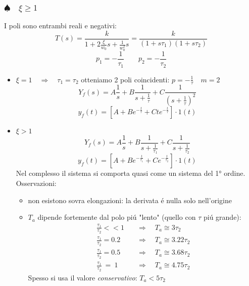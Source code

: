 \documentclass[../main.tex]{subfiles}
\begin{document}
	\subsubsection{$ \spadesuit \quad \xi \geq 1 $}
	I poli sono entrambi reali e negativi:
	\[ T(s) = \frac{k}{1+2\frac{\xi}{w_0}s+\frac{1}{w_0^2}s} = \frac{k}{(1+s\tau_1)(1+s\tau_2)} \]
	\[ p_1 = -\frac{1}{\tau_1} \qquad p_2 = -\frac{1}{\tau_2} \]
	\begin{itemize}
		\item $ \xi = 1 \quad \Rightarrow \quad \tau_1 = \tau_2 $
		otteniamo 2 poli coincidenti: $ p = -\frac{1}{\tau} \quad m = 2 $
		\[ Y_f(s) = A\frac{1}{s} + B\frac{1}{s+\frac{1}{\tau}} + C\frac{1}{(s+\frac{1}{\tau})^2} \]
		\[ y_f(t) = \left[ A + Be^{-\frac{t}{\tau}} + C t e^{-\frac{t}{\tau}} \right] \cdot 1(t) \]
		\item $ \xi > 1 $
		\[ Y_f(s) = A\frac{1}{s} + B\frac{1}{s+\frac{1}{\tau_1}} + C\frac{1}{s+\frac{1}{\tau_2}} \]
		\[ y_f(t) = \left[ A + Be^{-\frac{t}{\tau_1}} + Ce^{-\frac{t}{\tau_2}} \right] \cdot 1(t) \]
		Nel complesso il sistema si comporta quasi come un sistema del 1° ordine.\\
		Osservazioni:
		\begin{itemize}
			\item non esistono sovra elongazioni: la derivata \'e nulla solo nell'origine
			\item $ T_a $ dipende fortemente dal polo pi\'u "lento" (quello con $ \tau $ pi\'u grande):
			\begin{align*}
				\frac{\tau_1}{\tau_2} << 1 \quad &\Rightarrow \quad T_a \cong 3 \tau_2\\
				\frac{\tau_1}{\tau_2} = 0.2 \quad &\Rightarrow \quad T_a \cong 3.22 \tau_2\\
				\frac{\tau_1}{\tau_2} = 0.5 \quad &\Rightarrow \quad T_a \cong 3.68 \tau_2\\
				\frac{\tau_1}{\tau_2}\ =\ 1 \quad &\Rightarrow \quad T_a \cong 4.75 \tau_2
			\end{align*}
			Spesso si usa il valore \textit{conservativo}: $ T_a < 5 \tau_2 $
		\end{itemize}
	\end{itemize}
\end{document}
